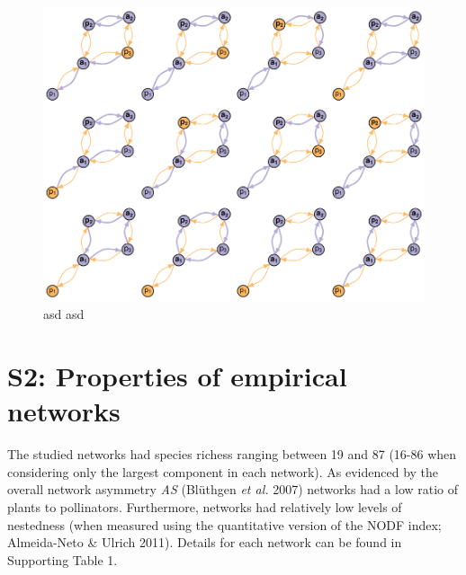 \documentclass[a4paper]{artikel1}
\begin{document}
\begin{figure}[htbp]
\centering
\includegraphics{supp_info_2_files/figure-latex/fig-matchings-bidirectional-no-1.pdf}
\caption{asd asd}
\end{figure}

\section{S2: Properties of empirical
networks}\label{s2-properties-of-empirical-networks}

The studied networks had species richess ranging between 19 and 87
(16-86 when considering only the largest component in each network). As
evidenced by the overall network asymmetry \emph{AS} (Blüthgen \emph{et
al.} 2007) networks had a low ratio of plants to pollinators.
Furthermore, networks had relatively low levels of nestedness (when
measured using the quantitative version of the NODF index; Almeida-Neto
\& Ulrich 2011). Details for each network can be found in Supporting
Table 1.
\end{document}
